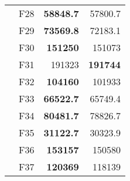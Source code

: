 \begin{table}[]
\begin{tabular}{ll|r|r|}
\multicolumn{1}{|l|}{\cellcolor[HTML]{ECF4FF}}                           & \cellcolor[HTML]{FCE6AB}F28     & \cellcolor[HTML]{D3FFB6}\textbf{58848.7}                       & 57800.7                                                   \\ \cline{2-4} 
\multicolumn{1}{|l|}{\cellcolor[HTML]{ECF4FF}}                           & \cellcolor[HTML]{FCE6AB}F29     & \cellcolor[HTML]{D3FFB6}\textbf{73569.8}                       & 72183.1                                                   \\ \cline{2-4} 
\multicolumn{1}{|l|}{\cellcolor[HTML]{ECF4FF}}                           & \cellcolor[HTML]{FCE6AB}F30     & \cellcolor[HTML]{D3FFB6}\textbf{151250}                        & 151073                                                    \\ \cline{2-4} 
\multicolumn{1}{|l|}{\cellcolor[HTML]{ECF4FF}}                           & \cellcolor[HTML]{FCE6AB}F31     & 191323                                                         & \cellcolor[HTML]{D3FFB6}\textbf{191744}                   \\ \cline{2-4} 
\multicolumn{1}{|l|}{\cellcolor[HTML]{ECF4FF}}                           & \cellcolor[HTML]{FCE6AB}F32     & \cellcolor[HTML]{D3FFB6}\textbf{104160}                        & 101933                                                    \\ \cline{2-4} 
\multicolumn{1}{|l|}{\cellcolor[HTML]{ECF4FF}}                           & \cellcolor[HTML]{FCE6AB}F33     & \cellcolor[HTML]{D3FFB6}\textbf{66522.7}                       & 65749.4                                                   \\ \cline{2-4} 
\multicolumn{1}{|l|}{\cellcolor[HTML]{ECF4FF}}                           & \cellcolor[HTML]{FCE6AB}F34     & \cellcolor[HTML]{D3FFB6}\textbf{80481.7}                       & 78826.7                                                   \\ \cline{2-4} 
\multicolumn{1}{|l|}{\cellcolor[HTML]{ECF4FF}}                           & \cellcolor[HTML]{FCE6AB}F35     & \cellcolor[HTML]{D3FFB6}\textbf{31122.7}                       & 30323.9                                                   \\ \cline{2-4} 
\multicolumn{1}{|l|}{\cellcolor[HTML]{ECF4FF}}                           & \cellcolor[HTML]{FCE6AB}F36     & \cellcolor[HTML]{D3FFB6}\textbf{153157}                        & 150580                                                    \\ \cline{2-4} 
\multicolumn{1}{|l|}{\cellcolor[HTML]{ECF4FF}}                           & \cellcolor[HTML]{FCE6AB}F37     & \cellcolor[HTML]{D3FFB6}\textbf{120369}                        & 118139                                                    \\ \cline{2-4} 

\end{tabular}
\end{table}
